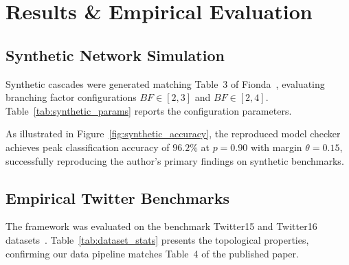 \documentclass[10pt,twocolumn]{article}
\begin{document}
\section{Results \& Empirical Evaluation}

\subsection{Synthetic Network Simulation}
Synthetic cascades were generated matching Table~3 of Fionda~\cite{fionda2025logic}, evaluating branching factor configurations $BF \in [2, 3]$ and $BF \in [2, 4]$. Table~\ref{tab:synthetic_params} reports the configuration parameters.

\begin{table}[h]
\centering
{}
\caption{Synthetic cascade generation parameters.}
\label{tab:synthetic_params}
\end{table}

As illustrated in Figure~\ref{fig:synthetic_accuracy}, the reproduced model checker achieves peak classification accuracy of $96.2\%$ at $p = 0.90$ with margin $\theta = 0.15$, successfully reproducing the author's primary findings on synthetic benchmarks.

\subsection{Empirical Twitter Benchmarks}
The framework was evaluated on the benchmark Twitter15 and Twitter16 datasets~\cite{ma2016detecting,ma2017detect}. Table~\ref{tab:dataset_stats} presents the topological properties, confirming our data pipeline matches Table~4 of the published paper.
\end{document}
